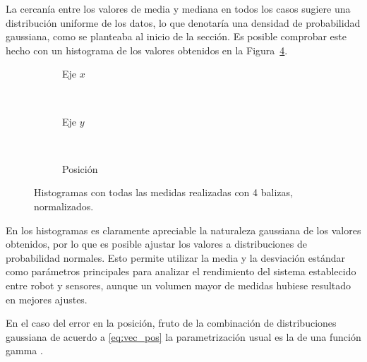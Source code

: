 La cercanía entre los valores de media y mediana en todos los casos sugiere una distribución uniforme de los datos, lo que denotaría una densidad de probabilidad gaussiana, como se planteaba al inicio de la sección.
Es posible comprobar este hecho con un histograma de los valores obtenidos en la Figura~\ref{fig:histogramas_lab_4sens}.
\begin{figure}[H]
    \hspace*{-0.5cm}
    \begin{subfigure}[b]{.3\textwidth}
      \centering
       
      \vspace*{-0.5cm}
      \caption{Eje $x$}
      \label{fig:histogramas_lab_4sens_x}
    \end{subfigure}
    ~~~~~~~~~
    \begin{subfigure}[b]{.3\textwidth}
      \centering
      
      \vspace*{-0.5cm}
      \caption{Eje $y$}
      \label{fig:histogramas_lab_4sens_y}
    \end{subfigure}
    ~~~~~
    \begin{subfigure}[b]{.3\textwidth}
        \centering
        
        \vspace*{-0.5cm}
        \caption{Posición}
        \label{fig:histogramas_lab_4sens_pos}
      \end{subfigure}
    \caption{Histogramas con todas las medidas realizadas con 4 balizas, normalizados.}
    \label{fig:histogramas_lab_4sens}
  \end{figure}

En los histogramas es claramente apreciable la naturaleza gaussiana de los valores obtenidos, por lo que es posible ajustar los valores a distribuciones de probabilidad normales.
Esto permite utilizar la media y la desviación estándar como parámetros principales para analizar el rendimiento del sistema establecido entre robot y sensores, aunque un volumen mayor de medidas hubiese resultado en mejores ajustes.

En el caso del error en la posición, fruto de la combinación de distribuciones gaussiana de acuerdo a \eqref{eq:vec_pos} la parametrización usual es la de una función gamma \cite{jimenez}.


